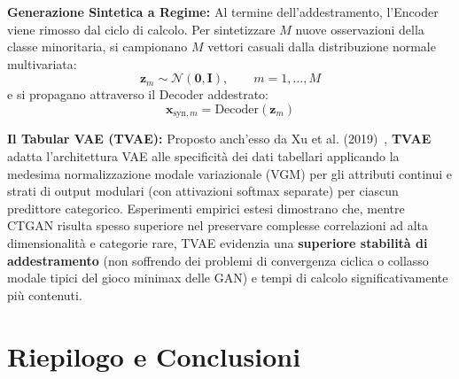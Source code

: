 \textbf{Generazione Sintetica a Regime:}
Al termine dell'addestramento, l'Encoder viene rimosso dal ciclo di calcolo. Per sintetizzare $M$ nuove osservazioni della classe minoritaria, si campionano $M$ vettori casuali dalla distribuzione normale multivariata:
\begin{equation}
    \mathbf{z}_m \sim \mathcal{N}(\mathbf{0}, \mathbf{I}), \qquad m = 1, \dots, M
\end{equation}
e si propagano attraverso il Decoder addestrato:
\begin{equation}
    \mathbf{x}_{\text{syn}, m} = \text{Decoder}(\mathbf{z}_m)
\end{equation}

\textbf{Il Tabular VAE (TVAE):}
Proposto anch'esso da Xu et al. (2019)~\cite{xu2019}, \textbf{TVAE} adatta l'architettura VAE alle specificità dei dati tabellari applicando la medesima normalizzazione modale variazionale (VGM) per gli attributi continui e strati di output modulari (con attivazioni softmax separate) per ciascun predittore categorico. Esperimenti empirici estesi dimostrano che, mentre CTGAN risulta spesso superiore nel preservare complesse correlazioni ad alta dimensionalità e categorie rare, TVAE evidenzia una \textbf{superiore stabilità di addestramento} (non soffrendo dei problemi di convergenza ciclica o collasso modale tipici del gioco minimax delle GAN) e tempi di calcolo significativamente più contenuti.
\FloatBarrier
\section{Riepilogo e Conclusioni}
\label{sec:dm-ch24-conclusioni}

